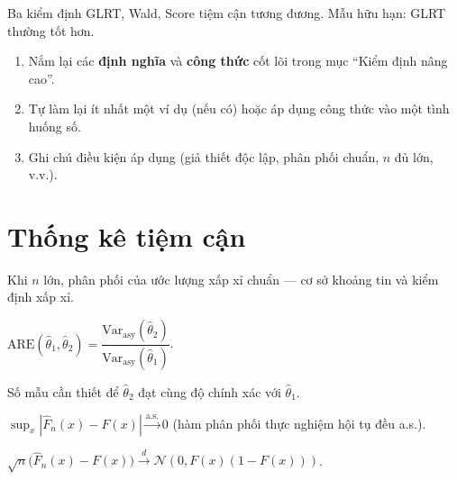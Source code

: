 \documentclass[12pt,a4paper]{article}
\begin{document}
\begin{luuy}
  Ba kiểm định GLRT, Wald, Score tiệm cận tương đương. Mẫu hữu hạn: GLRT thường tốt hơn.
\end{luuy}


\begin{tongket}[title={Tổng kết: Kiểm định nâng cao}]
\begin{enumerate}
  \item Nắm lại các \textbf{định nghĩa} và \textbf{công thức} cốt lõi trong mục ``Kiểm định nâng cao''.
  \item Tự làm lại ít nhất một ví dụ (nếu có) hoặc áp dụng công thức vào một tình huống số.
  \item Ghi chú điều kiện áp dụng (giả thiết độc lập, phân phối chuẩn, $n$ đủ lớn, v.v.).
\end{enumerate}
\end{tongket}

\section{Thống kê tiệm cận}

\begin{dongco}[title={Động cơ --- Thống kê tiệm cận}]
Khi $n$ lớn, phân phối của ước lượng xấp xỉ chuẩn --- cơ sở khoảng tin và kiểm định xấp xỉ.
\end{dongco}

\begin{dinhnghia}[title={Hiệu quả tương đối tiệm cận (ARE)}]
  $\text{ARE}(\hat{\theta}_1, \hat{\theta}_2) = \dfrac{\text{Var}_{\text{asy}}(\hat{\theta}_2)}{\text{Var}_{\text{asy}}(\hat{\theta}_1)}$.

  Số mẫu cần thiết để $\hat{\theta}_2$ đạt cùng độ chính xác với $\hat{\theta}_1$.
\end{dinhnghia}

\begin{dinhly}[title={Định lý Glivenko--Cantelli}]
  $\sup_x |\hat{F}_n(x) - F(x)| \xrightarrow{\text{a.s.}} 0$ (hàm phân phối thực nghiệm hội tụ đều a.s.).
\end{dinhly}

\begin{dinhly}[title={Hệ quả CLT cho $\hat{F}_n$}]
  $\sqrt{n}\bigl(\hat{F}_n(x) - F(x)\bigr) \xrightarrow{d} \mathcal{N}\!\left(0, F(x)(1-F(x))\right)$.
\end{dinhly}
\end{document}
